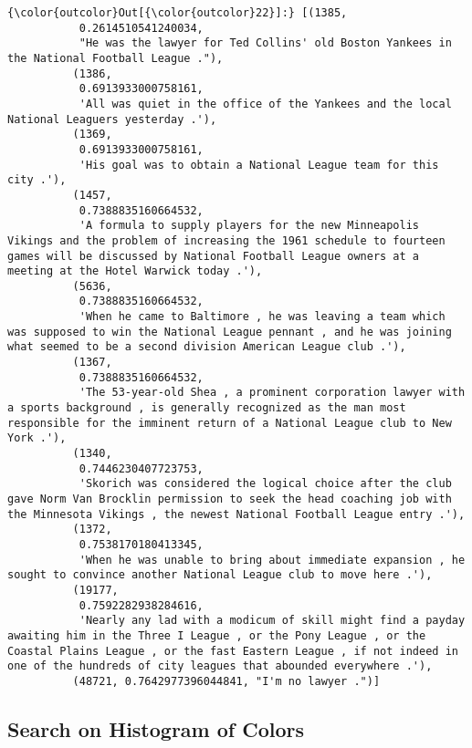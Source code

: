 \documentclass[11pt]{article}
\begin{document}
\begin{Verbatim}[commandchars=\\\{\}]
{\color{outcolor}Out[{\color{outcolor}22}]:} [(1385,
           0.2614510541240034,
           "He was the lawyer for Ted Collins' old Boston Yankees in the National Football League ."),
          (1386,
           0.6913933000758161,
           'All was quiet in the office of the Yankees and the local National Leaguers yesterday .'),
          (1369,
           0.6913933000758161,
           'His goal was to obtain a National League team for this city .'),
          (1457,
           0.7388835160664532,
           'A formula to supply players for the new Minneapolis Vikings and the problem of increasing the 1961 schedule to fourteen games will be discussed by National Football League owners at a meeting at the Hotel Warwick today .'),
          (5636,
           0.7388835160664532,
           'When he came to Baltimore , he was leaving a team which was supposed to win the National League pennant , and he was joining what seemed to be a second division American League club .'),
          (1367,
           0.7388835160664532,
           'The 53-year-old Shea , a prominent corporation lawyer with a sports background , is generally recognized as the man most responsible for the imminent return of a National League club to New York .'),
          (1340,
           0.7446230407723753,
           'Skorich was considered the logical choice after the club gave Norm Van Brocklin permission to seek the head coaching job with the Minnesota Vikings , the newest National Football League entry .'),
          (1372,
           0.7538170180413345,
           'When he was unable to bring about immediate expansion , he sought to convince another National League club to move here .'),
          (19177,
           0.7592282938284616,
           'Nearly any lad with a modicum of skill might find a payday awaiting him in the Three I League , or the Pony League , or the Coastal Plains League , or the fast Eastern League , if not indeed in one of the hundreds of city leagues that abounded everywhere .'),
          (48721, 0.7642977396044841, "I'm no lawyer .")]
\end{Verbatim}
            
    \hypertarget{search-on-histogram-of-colors}{%
\subsection{ Search on Histogram of
Colors}\label{search-on-histogram-of-colors}}
\end{document}

